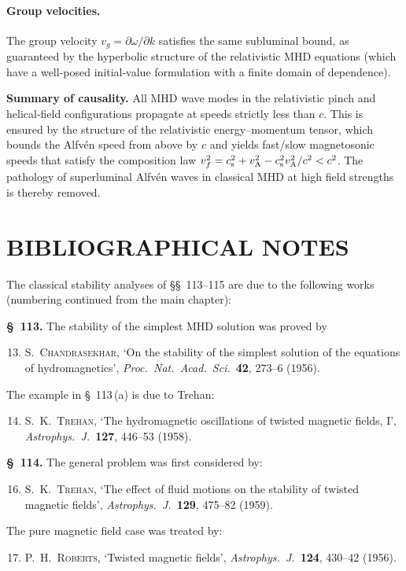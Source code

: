 \paragraph{Group velocities.}
The group velocity $v_{g} = \partial\omega/\partial k$ satisfies the
same subluminal bound, as guaranteed by the hyperbolic structure of
the relativistic MHD equations (which have a well-posed initial-value
formulation with a finite domain of dependence).

\begin{relcorrection}
\textbf{Summary of causality.}
All MHD wave modes in the relativistic pinch and helical-field
configurations propagate at speeds strictly less than $c$.  This is
ensured by the structure of the relativistic energy--momentum tensor,
which bounds the Alfv\'en speed from above by $c$ and yields
fast/slow magnetosonic speeds that satisfy the composition law
$v_{f}^{2} = c_{\mathrm{s}}^{2} + v_{\mathrm{A}}^{2} - c_{\mathrm{s}}^{2}v_{\mathrm{A}}^{2}/c^{2} < c^{2}$.
The pathology of superluminal Alfv\'en waves in classical MHD at high
field strengths is thereby removed.
\end{relcorrection}

\section*{BIBLIOGRAPHICAL NOTES}
\label{sec:rel-12-113-115-bib}

The classical stability analyses of \S\S~113--115 are due to the
following works (numbering continued from the main chapter):

\medskip\noindent
\textbf{\S~113.}  The stability of the simplest MHD solution was
proved by
\begin{enumerate}
\setcounter{enumi}{12}
\item S.~\textsc{Chandrasekhar}, `On the stability of the simplest
  solution of the equations of hydromagnetics', \emph{Proc.\ Nat.\
  Acad.\ Sci.}\ \textbf{42}, 273--6 (1956).
\end{enumerate}
The example in \S~113\,(a) is due to Trehan:
\begin{enumerate}
\setcounter{enumi}{13}
\item S.~K.~\textsc{Trehan}, `The hydromagnetic oscillations of
  twisted magnetic fields, I', \emph{Astrophys.\ J.}\ \textbf{127},
  446--53 (1958).
\end{enumerate}

\medskip\noindent
\textbf{\S~114.}  The general problem was first considered by:
\begin{enumerate}
\setcounter{enumi}{15}
\item S.~K.~\textsc{Trehan}, `The effect of fluid motions on the
  stability of twisted magnetic fields', \emph{Astrophys.\ J.}\
  \textbf{129}, 475--82 (1959).
\end{enumerate}
The pure magnetic field case was treated by:
\begin{enumerate}
\setcounter{enumi}{16}
\item P.~H.~\textsc{Roberts}, `Twisted magnetic fields',
  \emph{Astrophys.\ J.}\ \textbf{124}, 430--42 (1956).
\end{enumerate}

